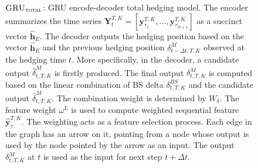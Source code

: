\documentclass[letterpaper,12pt,titlepage,oneside,final]{book}
\numberwithin{equation}{section}
\theoremstyle{definition}
\newcommand{\modelT}{\textsc{GRU}_{\textsc{total}}}
\newcommand{\vy}{\mathbf{y}}
\newcommand{\DT}{\Delta t}
\begin{document}
\begin{figure}[htp!]
{
	}
	\caption{$\modelT$: GRU encode-decoder total hedging model. The encoder summarizes the time series $\mathbf{Y}_{t}^{T,K}=\left[\vy^{T,K}_{\tau_{1}},\dots,\vy^{T,K}_{\tau_{N+1}}\right]$ as a succinct  vector $\widehat{\mathbf{h}}_E$. The decoder outputs the hedging position based on the vector $\widehat{\mathbf{h}}_E$ and the previous hedging position $\delta^M_{t-\Delta t,T,K}$ observed at the hedging time $t$. More specifically, in the decoder, a candidate output $\widehat{\delta}^M_{t,T,K}$ is firstly produced. The final output $\delta^M_{t,T,K}$ is computed based on the linear combination of BS delta $\delta^{BS}_{t,T,K}$ and the candidate output  $\widehat{\delta}^M_{t,T,K}$. The combination weight is determined by  $W_{\delta}$. The feature weight $\omega^L$ is used to compute weighted sequential feature $\widehat{\vy}^{T,K}_{\tau}$. The weighting acts as a feature selection process.
		Each edge in the graph has an arrow on it, pointing from a node whose output is used by the node pointed by the arrow as an input. The output $\delta^M_{t,T,K}$ at $t$ is used as the input for next step $t+\DT$.}
	\label{fig:RNNModelTotal}
\end{figure}
\end{document}
